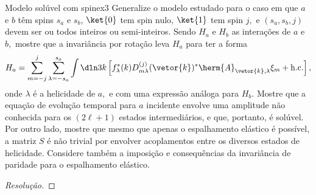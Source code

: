 \begin{exercício}{Modelo solúvel com spin}{ex3}
   Generalize o modelo estudado para o caso em que \(a\) e \(b\) têm spins \(s_a\) e \(s_b\), \(\ket{0}\) tem spin nulo, \(\ket{1}\) tem spin \(j,\) e \((s_a,s_b,j)\) devem ser ou todos inteiros ou semi-inteiros. Sendo \(H_a\) e \(H_b\) as interações de \(a\) e \(b,\) mostre que a invariância por rotação leva \(H_a\) para ter a forma
   \begin{equation*}
      H_a = \sum_{m = -j}^j \sum_{\lambda = -s_a}^{s_a} \int \dln3k \left[f_{\lambda}^*(k) D^{(j)}_{m \lambda}(\vetor{k})^* \herm{A}_{\vetor{k}, \lambda} \xi_m + \mathrm{h.c.}\right],
   \end{equation*}
   onde \(\lambda\) é a helicidade de \(a,\) e com uma expressão análoga para \(H_b\). Mostre que a equação de evolução temporal para \(a\) incidente envolve uma amplitude não conhecida para os \((2\ell + 1)\) estados intermediários, e que, portanto, é solúvel. Por outro lado, mostre que mesmo que apenas o espalhamento elástico é possível, a matriz \(S\) é não trivial por envolver acoplamentos entre os diversos estados de helicidade. Considere também a imposição e consequências da invariância de paridade para o espalhamento elástico.
\end{exercício}
\begin{proof}[Resolução]
    
\end{proof}
